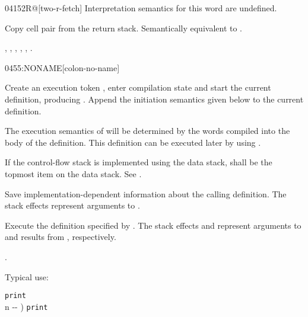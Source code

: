 \begin{worddef}{0415}{2R@}[two-r-fetch]
\interpret
	Interpretation semantics for this word are undefined.

\execute

	Copy cell pair  from the return stack.
	Semantically equivalent to   
	  .

\see {},
	,
	,
	,
	,
	.
\end{worddef}


\begin{worddef}{0455}{:NONAME}[colon-no-name]
\item {}

	Create an execution token , enter compilation state
	and start the current definition, producing .
	Append the initiation semantics given below to the current
	definition.

	The execution semantics of  will be determined by the
	words compiled into the body of the definition. This definition
	can be executed later by using  .

	If the control-flow stack is implemented using the data stack,
	 shall be the topmost item on the data stack.
	See .

\init

	Save implementation-dependent information 
	about the calling definition. The stack effects 
	represent arguments to .

\execute[xt]

	Execute the definition specified by . The stack
	effects  and  represent arguments to
	and results from , respectively.

\see {}.

	\begin{rationale} %
		Typical use:

		\tab {} \texttt{print} \\[2ex]
		\tab {}  n -{}- )  \word{;}  \texttt{print}


\end{rationale}
\end{worddef}
